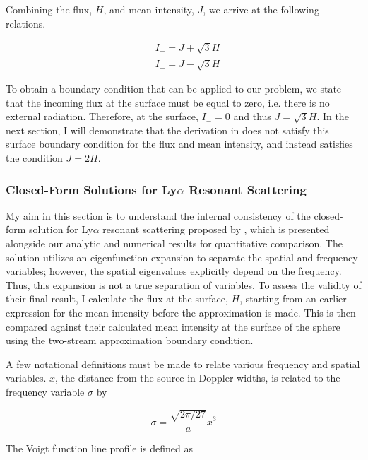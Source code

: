 \documentclass[onecolumn]{aastex63}
\begin{document}
Combining the flux, $H$, and mean intensity, $J$, we arrive at the following relations.

\begin{equation}
    \begin{split}
        &I_+ = J + \sqrt{3}H \\
        &I_- = J - \sqrt{3}H
    \end{split}
\end{equation}

To obtain a boundary condition that can be applied to our problem, we state that the incoming flux at the surface must be equal to zero, i.e. there is no external radiation. Therefore, at the surface, $I_- = 0$ and thus $J=\sqrt{3}H$. In the next section, I will demonstrate that the derivation in \cite{2006ApJ...649...14D} does not satisfy this surface boundary condition for the flux and mean intensity, and instead satisfies the condition $J = 2H$.

\subsubsection{Closed-Form Solutions for Ly$\alpha$ Resonant Scattering}

My aim in this section is to understand the internal consistency of the closed-form solution for Ly$\alpha$ resonant scattering proposed by \cite{2006ApJ...649...14D}, which is presented alongside our analytic and numerical results for quantitative comparison. The solution utilizes an eigenfunction expansion to separate the spatial and frequency variables; however, the spatial eigenvalues explicitly depend on the frequency. Thus, this expansion is not a true separation of variables. To assess the validity of their final result, I calculate the flux at the surface, $H$, starting from an earlier expression for the mean intensity before the approximation is made. This is then compared against their calculated mean intensity at the surface of the sphere using the two-stream approximation boundary condition.

A few notational definitions must be made to relate various frequency and spatial variables. $x$, the distance from the source in Doppler widths, is related to the frequency variable $\sigma$ by 

\begin{equation} \label{sigma}
    \sigma = \frac{\sqrt{2\pi/27}}{a} x^3
\end{equation}

The Voigt function line profile is defined as 
\end{document}
